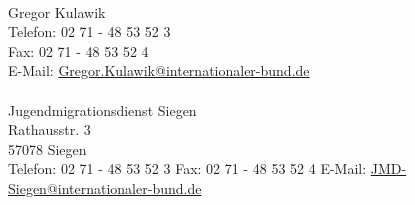 \paragraph{}
Gregor Kulawik\\
Telefon: 02 71 - 48 53 52 3\\
Fax: 02 71 - 48 53 52 4\\
E-Mail: \href{mailto:Gregor.Kulawik@internationaler-bund.de}{Gregor.Kulawik@internationaler-bund.de}\\
\\
Jugendmigrationsdienst Siegen\\
Rathausstr. 3\\
57078 Siegen \\
Telefon: 02 71 - 48 53 52 3
Fax: 02 71 - 48 53 52 4
E-Mail: \href{mailto:JMD-Siegen@internationaler-bund.de}{JMD-Siegen@internationaler-bund.de}